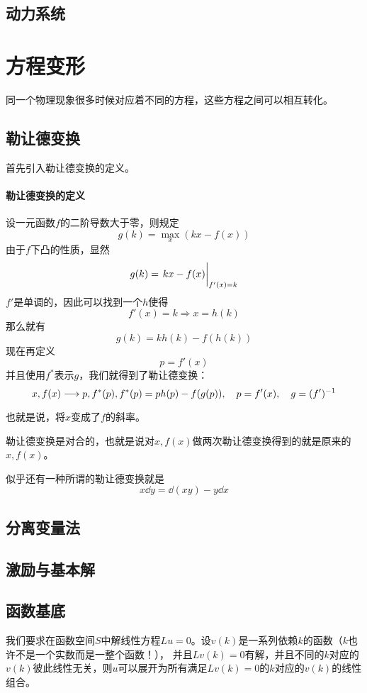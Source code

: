 \documentclass[UTF8, a4paper]{ctexart}
\begin{document}
\subsection{动力系统}



\section{方程变形}
同一个物理现象很多时候对应着不同的方程，这些方程之间可以相互转化。

\subsection{勒让德变换}
首先引入勒让德变换的定义。
\paragraph{勒让德变换的定义} 设一元函数$f$的二阶导数大于零，则规定
\[
    g(k) = \max_x (kx - f(x))
\]
由于$f$下凸的性质，显然
\[
    g(k) = \eval{kx - f(x)}_{f'(x)=k}
\]
$f'$是单调的，因此可以找到一个$h$使得
\[
    f'(x)=k \Rightarrow x = h(k)
\]
那么就有
\[
    g(k) = k h(k) - f(h(k))
\]
现在再定义
\[
    p = f'(x)
\]
并且使用$f^*$表示$g$，我们就得到了勒让德变换：
\begin{equation}
    x, f(x) \longrightarrow p, f^*(p), \\
    f^*(p) = p h(p) - f(g(p)), \quad p = f'(x), \quad g=(f')^{-1}
\end{equation}

也就是说，将$x$变成了$f$的斜率。

勒让德变换是对合的，也就是说对$x, f(x)$做两次勒让德变换得到的就是原来的$x, f(x)$。

似乎还有一种所谓的勒让德变换就是
\[
    x \dd y = \dd (xy) - y \dd x
\]

\subsection{分离变量法}

\subsection{激励与基本解}

\subsection{函数基底}
我们要求在函数空间$S$中解线性方程$Lu=0$。设$v(k)$是一系列依赖$k$的函数（$k$也许不是一个实数而是一整个函数！），
并且$Lv(k)=0$有解，并且不同的$k$对应的$v(k)$彼此线性无关，则$u$可以展开为所有满足$Lv(k)=0$的$k$对应的$v(k)$的线性组合。
\end{document}
